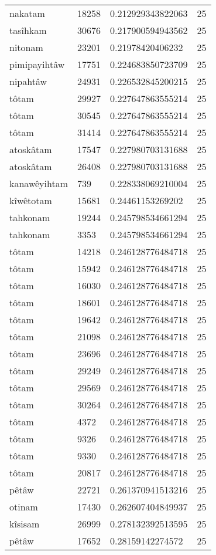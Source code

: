 \begin{longtable}{llll}
nakatam & 18258 & 0.212929343822063 & 25 \\
tasîhkam & 30676 & 0.217900594943562 & 25 \\
nitonam & 23201 & 0.21978420406232 & 25 \\
pimipayihtâw & 17751 & 0.224683850723709 & 25 \\
nipahtâw & 24931 & 0.226532845200215 & 25 \\
tôtam & 29927 & 0.227647863555214 & 25 \\
tôtam & 30545 & 0.227647863555214 & 25 \\
tôtam & 31414 & 0.227647863555214 & 25 \\
atoskâtam & 17547 & 0.227980703131688 & 25 \\
atoskâtam & 26408 & 0.227980703131688 & 25 \\
kanawêyihtam & 739 & 0.228338069210004 & 25 \\
kîwêtotam & 15681 & 0.24461153269202 & 25 \\
tahkonam & 19244 & 0.245798534661294 & 25 \\
tahkonam & 3353 & 0.245798534661294 & 25 \\
tôtam & 14218 & 0.246128776484718 & 25 \\
tôtam & 15942 & 0.246128776484718 & 25 \\
tôtam & 16030 & 0.246128776484718 & 25 \\
tôtam & 18601 & 0.246128776484718 & 25 \\
tôtam & 19642 & 0.246128776484718 & 25 \\
tôtam & 21098 & 0.246128776484718 & 25 \\
tôtam & 23696 & 0.246128776484718 & 25 \\
tôtam & 29249 & 0.246128776484718 & 25 \\
tôtam & 29569 & 0.246128776484718 & 25 \\
tôtam & 30264 & 0.246128776484718 & 25 \\
tôtam & 4372 & 0.246128776484718 & 25 \\
tôtam & 9326 & 0.246128776484718 & 25 \\
tôtam & 9330 & 0.246128776484718 & 25 \\
tôtam & 20817 & 0.246128776484718 & 25 \\
pêtâw & 22721 & 0.261370941513216 & 25 \\
otinam & 17430 & 0.262607404849937 & 25 \\
kîsisam & 26999 & 0.278132392513595 & 25 \\
pêtâw & 17652 & 0.28159142274572 & 25 \\

\end{longtable}
